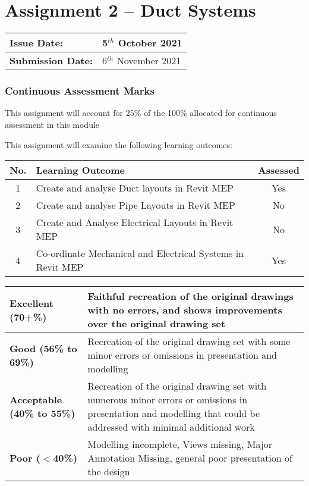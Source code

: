 
	
\part*{Assignment 2 – Duct Systems}

\begin{tabularx}{\textwidth}{ |X|X| }
	\hline
	\textbf{Issue Date:} & 5$^{th}$ October 2021 \\
	\hline 
	\textbf{Submission Date:}  & 6$^{th}$ November 2021  \\
	\hline
\end{tabularx}


\section*{Continuous Assessment Marks}
This assignment will account for 25\% of the 100\% allocated for continuous assessment in this module

This assignment will examine the following learning outcomes:\\

\begin{tabularx}{\textwidth}{ |c|X|c| }
	\hline
	\textbf{No.} & \textbf{Learning Outcome} & \textbf{Assessed} \\
	\hline 
	1  & Create and analyse Duct layouts in Revit MEP & Yes \\
	2  & Create and analyse Pipe Layouts in Revit MEP & No \\
	3  & Create and Analyse Electrical Layouts in Revit MEP & No \\
	4  & Co-ordinate Mechanical and Electrical Systems in Revit MEP & Yes \\
	\hline
\end{tabularx}

\vspace{1cm}

\begin{tabularx}{\textwidth}{ |l|X| }
	\hline 
	\textbf{Excellent (70+\%)} & Faithful recreation of the original drawings with no errors, and shows improvements over the original drawing set\\ 
	\hline
	\textbf{Good (56\% to 69\%)} & Recreation of the original drawing set with some minor errors or omissions in presentation and modelling \\
	\hline
	\textbf{Acceptable (40\% to 55\%)} & Recreation of the original drawing set with numerous minor errors or omissions in presentation and modelling that could be addressed with minimal additional work \\ 
	\hline
	\textbf{Poor ($<$40\%)} & Modelling incomplete, Views missing, Major Annotation Missing, general poor presentation of the design  \\
	\hline
\end{tabularx}

